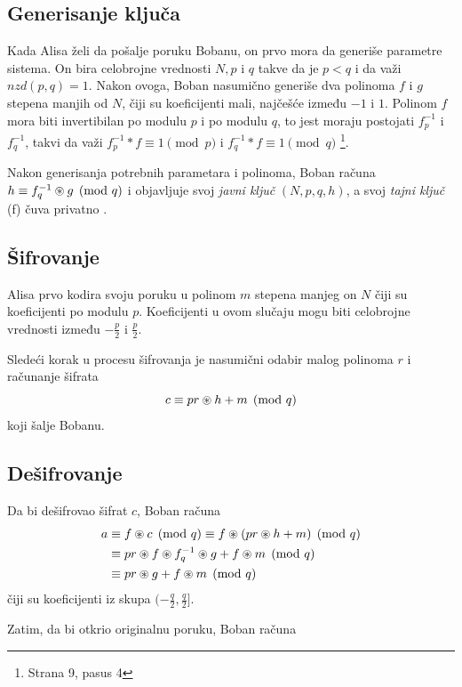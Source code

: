 \subsection{Generisanje ključa}

Kada Alisa želi da pošalje poruku Bobanu, on prvo mora da generiše parametre sistema. On bira celobrojne vrednosti $N, p$ i $q$ takve da je $p < q$ i da važi $nzd(p,q) = 1$. Nakon ovoga, Boban nasumično generiše dva polinoma $f$ i $g$ stepena manjih od $N$, čiji su koeficijenti mali, najčešće između $-1$ i $1$. Polinom $f$ mora biti invertibilan po modulu $p$ i po modulu $q$, to jest moraju postojati $f_p^{-1}$ i $f_q^{-1}$, takvi da važi $f_p^{-1} \ast f \equiv 1 \pmod p$ i $f_q^{-1} \ast f \equiv 1 \pmod q$ \cite{meyer2025postquantumcryptographyanalysiscodebased} \footnote{Strana 9, pasus 4}.

Nakon generisanja potrebnih parametara i polinoma, Boban računa $h \equiv f_q^{-1} \circledast g \pmod q $ i objavljuje svoj \textit{javni ključ} $(N,p,q, h)$, a svoj \textit{tajni ključ} (f) čuva privatno \cite{meyer2025postquantumcryptographyanalysiscodebased}.

\subsection{Šifrovanje}

Alisa prvo kodira svoju poruku u polinom $m$ stepena manjeg on $N$ čiji su koeficijenti po modulu $p$. Koeficijenti u ovom slučaju mogu biti celobrojne vrednosti između $-\frac{p}{2}$ i $\frac{p}{2}$. 

Sledeći korak u procesu šifrovanja je nasumični odabir malog polinoma $r$ i računanje šifrata
\[ c \equiv pr \circledast h + m \pmod q \]
koji šalje Bobanu.

\subsection{Dešifrovanje}

Da bi dešifrovao šifrat $c$, Boban računa
\begin{align*}
    a &\equiv f \circledast c \pmod q \equiv f \circledast (pr \circledast h +m) \pmod q \\
    &\equiv pr \circledast f \circledast f_q^{-1} \circledast g + f \circledast m \pmod q  \\
    &\equiv pr \circledast g + f \circledast m \pmod q 
\end{align*}
čiji su koeficijenti iz skupa $(-\frac{q}{2}, \frac{q}{2}]$.

Zatim, da bi otkrio originalnu poruku, Boban računa

